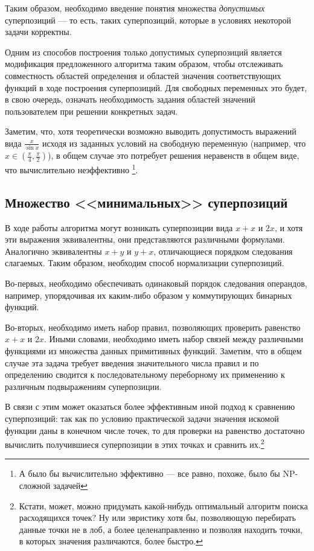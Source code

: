 \documentclass[12pt,a4paper]{amsart}
\begin{document}
Таким образом, необходимо введение понятия множества \emph{допустимых}
суперпозиций --- то есть, таких суперпозиций, которые в условиях некоторой
задачи корректны.

Одним из способов построения только допустимых суперпозиций является
модификация предложенного алгоритма таким образом, чтобы отслеживать
совместность областей определения и областей значения соответствующих
функций в ходе построения суперпозиций. Для свободных переменных это будет,
в свою очередь, означать необходимость задания областей значений пользователем
при решении конкретных задач.

Заметим, что, хотя теоретически возможно выводить допустимость выражений
вида $\frac{x}{\sin x}$ исходя из заданных условий на свободную переменную
(например, что $x \in (\frac{\pi}{4}, \frac{\pi}{2})$), в общем случае это
потребует решения неравенств в общем виде, что вычислительно неэффективно
\footnote{А было бы вычислительно эффективно --- все равно, похоже, было бы
NP-сложной задачей}.

\subsection{Множество <<минимальных>> суперпозиций}

В ходе работы алгоритма могут возникать суперпозиции вида $x + x$ и $2x$,
и хотя эти выражения эквивалентны, они представляются различными формулами.
Аналогично эквивалентны $x + y$ и $y + x$, отличающиеся порядком следования
слагаемых. Таким образом, необходим способ нормализации суперпозиций.

Во-первых, необходимо обеспечивать одинаковый порядок следования операндов,
например, упорядочивая их каким-либо образом у коммутирующих бинарных функций.

Во-вторых, необходимо иметь набор правил, позволяющих проверить равенство
$x + x$ и $2x$. Иными словами, необходимо иметь набор связей между различными
функциями из множества данных примитивных функций. Заметим, что в общем
случае эта задача требует введения значительного числа правил и по определению
сводится к последовательному переборному их применению к различным
подвыражениям суперпозиции.

В связи с этим может оказаться более эффективным иной подход к сравнению
суперпозиций: так как по условию практической задачи значения искомой функции
даны в конечном числе точек, то для проверки на равенство достаточно вычислить
получившиеся суперпозиции в этих точках и сравнить их.\footnote{Кстати, может,
можно придумать какой-нибудь оптимальный алгоритм поиска расходящихся точек?
Ну или эвристику хотя бы, позволяющую перебирать данные точки не в лоб, а
более целенаправленно и позволяя находить точки, в которых значения различаются,
более быстро.}
\end{document}

